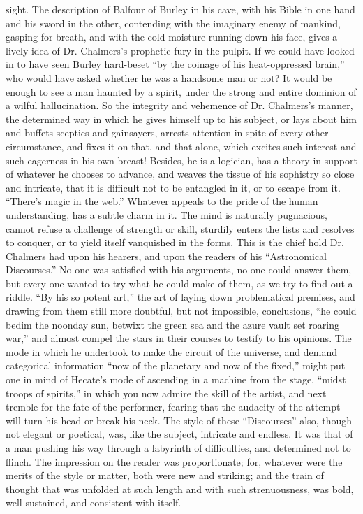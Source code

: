 sight. The description of Balfour of Burley in his cave, with his
Bible in one hand and his sword in the other, contending with the
imaginary enemy of mankind, gasping for breath, and with the cold
moisture running down his face, gives a lively idea of
Dr. Chalmers's prophetic fury in the pulpit. If we could have
looked in to have seen Burley hard-beset ``by the coinage of his
heat-oppressed brain,'' who would have asked whether he was a
handsome man or not? It would be enough to see a man haunted by a
spirit, under the strong and entire dominion of a wilful
hallucination. So the integrity and vehemence of Dr. Chalmers's
manner, the determined way in which he gives himself up to his
subject, or lays about him and buffets sceptics and gainsayers,
arrests attention in spite of every other circumstance, and fixes
it on that, and that alone, which excites such interest and such
eagerness in his own breast! Besides, he is a logician, has a
theory in support of whatever he chooses to advance, and weaves
the tissue of his sophistry so close and intricate, that it is
difficult not to be entangled in it, or to escape from
it. ``There's magic in the web.'' Whatever appeals to the pride of
the human understanding, has a subtle charm in it. The mind is
naturally pugnacious, cannot refuse a challenge of strength or
skill, sturdily enters the lists and resolves to conquer, or to
yield itself vanquished in the forms. This is the chief hold
Dr. Chalmers had upon his hearers, and upon the readers of his
``Astronomical Discourses.'' No one was satisfied with his
arguments, no one could answer them, but every one wanted to try
what he could make of them, as we try to find out a riddle. ``By
his so potent art,'' the art of laying down problematical premises,
and drawing from them still more doubtful, but not impossible,
conclusions, ``he could bedim the noonday sun, betwixt the green
sea and the azure vault set roaring war,'' and almost compel the
stars in their courses to testify to his opinions. The mode in
which he undertook to make the circuit of the universe, and demand
categorical information ``now of the planetary and now of the
fixed,'' might put one in mind of Hecate's mode of ascending in a
machine from the stage, ``midst troops of spirits,'' in which you
now admire the skill of the artist, and next tremble for the fate
of the performer, fearing that the audacity of the attempt will
turn his head or break his neck. The style of these ``Discourses''
also, though not elegant or poetical, was, like the subject,
intricate and endless. It was that of a man pushing his way
through a labyrinth of difficulties, and determined not to
flinch. The impression on the reader was proportionate; for,
whatever were the merits of the style or matter, both were new and
striking; and the train of thought that was unfolded at such
length and with such strenuousness, was bold, well-sustained, and
consistent with itself.

